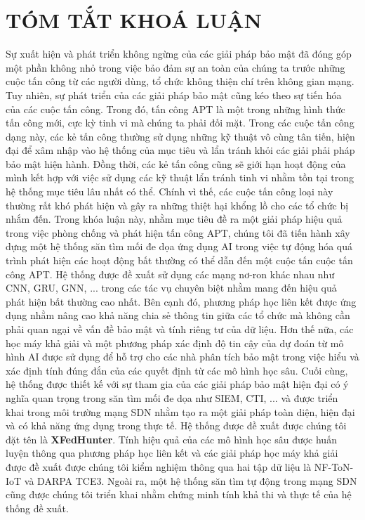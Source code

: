 \chapter*{TÓM TẮT KHOÁ LUẬN}

Sự xuất hiện và phát triển không ngừng của các giải pháp bảo mật đã đóng góp một phần không nhỏ trong việc bảo đảm sự an toàn của chúng ta trước những cuộc tấn công từ các người dùng, tổ chức không thiện chí trên không gian mạng. Tuy nhiên, sự phát triển của các giải pháp bảo mật cũng kéo theo sự tiến hóa của các cuộc tấn công. Trong đó, tấn công APT là một trong những hình thức tấn công mới, cực kỳ tinh vi mà chúng ta phải đối mặt. Trong các cuộc tấn công dạng này, các kẻ tấn công thường sử dụng những kỹ thuật vô cùng tân tiến, hiện đại để xâm nhập vào hệ thống của mục tiêu và lẩn tránh khỏi các giải phải pháp bảo mật hiện hành. Đồng thời, các kẻ tấn công cũng sẽ giới hạn hoạt động của mình kết hợp với việc sử dụng các kỹ thuật lẩn tránh tinh vi nhằm tồn tại trong hệ thống mục tiêu lâu nhất có thể. Chính vì thế, các cuộc tấn công loại này thường rất khó phát hiện và gây ra những thiệt hại khổng lồ cho các tổ chức bị nhắm đến.
\bigbreak\noindent
Trong khóa luận này, nhằm mục tiêu đề ra một giải pháp hiệu quả trong việc phòng chống và phát hiện tấn công APT, chúng tôi đã tiến hành xây dựng một hệ thống săn tìm mối đe dọa ứng dụng AI trong việc tự động hóa quá trình phát hiện các hoạt động bất thường có thể dẫn đến một cuộc tấn cuộc tấn công APT. Hệ thống được đề xuất sử dụng các mạng nơ-ron khác nhau như CNN, GRU, GNN, ... trong các tác vụ chuyên biệt nhằm mang đến hiệu quả phát hiện bất thường cao nhất. Bên cạnh đó, phương pháp học liên kết được ứng dụng nhằm nâng cao khả năng chia sẻ thông tin giữa các tổ chức mà không cần phải quan ngại về vấn đề bảo mật và tính riêng tư của dữ liệu. Hơn thế nữa, các học máy khả giải và một phương pháp xác định độ tin cậy của dự đoán từ mô hình AI được sử dụng để hỗ trợ cho các nhà phân tích bảo mật trong việc hiểu và xác định tính đúng đắn của các quyết định từ các mô hình học sâu. Cuối cùng, hệ thống được thiết kế với sự tham gia của các giải pháp bảo mật hiện đại có ý nghĩa quan trọng trong săn tìm mối đe dọa như SIEM, CTI, ... và được triển khai trong môi trường mạng SDN nhằm tạo ra một giải pháp toàn diện, hiện đại và có khả năng ứng dụng trong thực tế. Hệ thống được đề xuất được chúng tôi đặt tên là \textbf{XFedHunter}.
\bigbreak\noindent
Tính hiệu quả của các mô hình học sâu được huấn luyện thông qua phương pháp học liên kết và các giải pháp học máy khả giải được đề xuất được chúng tôi kiểm nghiệm thông qua hai tập dữ liệu là NF-ToN-IoT và DARPA TCE3. Ngoài ra, một hệ thống săn tìm tự động trong mạng SDN cũng được chúng tôi triển khai nhằm chứng minh tính khả thi và thực tế của hệ thống đề xuất.
